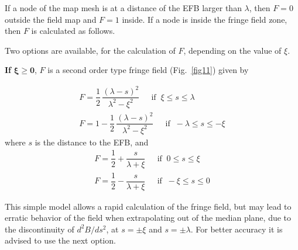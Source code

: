 \noindent If a node of the map mesh is at a distance of the EFB larger than
$\lambda$, then $  F=0 $ outside the field map and $ F=1 $ inside.  
If a node is inside the fringe field zone, then $  F$   is calculated as follows. 

\bigskip 

\noindent Two options are available, for the calculation of $ F$, depending
on the value of $\xi$. 

\medskip
\noindent\textbf{If } $\mathbf{\xi  \geq 0}$, $ F $ is a  second
order type fringe field (Fig.~\ref{fig11}) given by 


\begin{gather}
		F  = \dfrac{1 }{ 2} \, \dfrac{(\lambda -s)^2 }{ \lambda^2-\xi^ 2} \quad 
		         ~~ \text{if }~   \xi  \leq  s \leq \lambda  \\
		F  = 1- \dfrac{1 }{ 2} \, \dfrac{(\lambda -s)^2 }{ \lambda^2-\xi^ 2}\quad 
		        ~~ \text{if }~   -\lambda  \leq  s \leq  -\xi 
\end{gather}
where $ s $ is the distance to the EFB, and
\begin{gather}
		 F  = \dfrac{1 }{ 2} + \dfrac{s }{ \lambda +\xi} \quad
		         ~~ \text{if }~  0 \leq  s \leq  \xi  \\
	    F   = \dfrac{1 }{ 2} - \dfrac{s }{ \lambda +\xi}\quad  
		       ~~ \text{if }~   -\xi  \leq  s \leq  0  
\end{gather}
 
\noindent This simple model allows a rapid calculation of the fringe field,
but may lead to erratic behavior of the field when extrapolating out of the median plane, 
due to the discontinuity of $ d^2B/ds^2 $,  at $ s=\pm \xi $ and $ s=\pm \lambda $. 
For better  accuracy it is advised to use the next option. 

